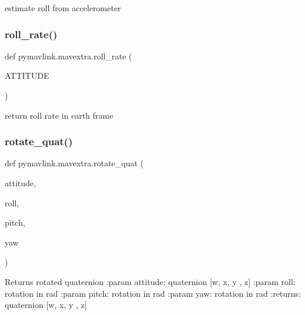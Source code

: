 \begin{DoxyVerb}estimate roll from accelerometer\end{DoxyVerb}
 \mbox{\label{namespacepymavlink_1_1mavextra_ad1a6d8f7d2affd450da8c9a6a3d36e05}} 
\subsubsection{\texorpdfstring{roll\+\_\+rate()}{roll\_rate()}}
{\footnotesize\ttfamily def pymavlink.\+mavextra.\+roll\+\_\+rate (\begin{DoxyParamCaption}\item[{}]{A\+T\+T\+I\+T\+U\+DE }\end{DoxyParamCaption})}

\begin{DoxyVerb}return roll rate in earth frame\end{DoxyVerb}
 \mbox{\label{namespacepymavlink_1_1mavextra_a44f4f12a741cc819b9197e09e78b4e78}} 
\subsubsection{\texorpdfstring{rotate\+\_\+quat()}{rotate\_quat()}}
{\footnotesize\ttfamily def pymavlink.\+mavextra.\+rotate\+\_\+quat (\begin{DoxyParamCaption}\item[{}]{attitude,  }\item[{}]{roll,  }\item[{}]{pitch,  }\item[{}]{yaw }\end{DoxyParamCaption})}

\begin{DoxyVerb}Returns rotated quaternion
:param attitude: quaternion [w, x, y , z]
:param roll: rotation in rad
:param pitch: rotation in rad
:param yaw: rotation in rad
:returns: quaternion [w, x, y , z]
\end{DoxyVerb}
 \mbox{\label{namespacepymavlink_1_1mavextra_a28d2ae204e94f85443cb66a3f4231d80}} 
